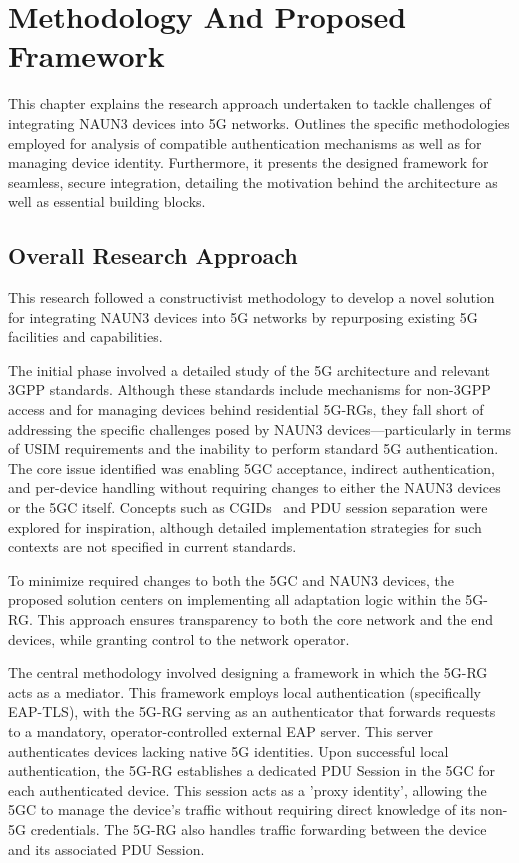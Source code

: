 \chapter{Methodology And Proposed Framework}%
\label{chapter:methodology-and-proposed-framework}

\begin{introduction}
This chapter explains the research approach undertaken to tackle challenges of integrating \ac{NAUN3} devices into \ac{5G} networks. Outlines the specific methodologies employed for analysis of compatible authentication mechanisms as well as for managing device identity. Furthermore, it presents the designed framework for seamless, secure integration, detailing the motivation behind the architecture as well as essential building blocks.
\end{introduction}

\section{Overall Research Approach}

This research followed a constructivist methodology to develop a novel solution for integrating \ac{NAUN3} devices into \ac{5G} networks by repurposing existing \ac{5G} facilities and capabilities.

The initial phase involved a detailed study of the \ac{5G} architecture and relevant \ac{3GPP} standards. Although these standards include mechanisms for non-\ac{3GPP} access and for managing devices behind residential \acp{5G-RG}, they fall short of addressing the specific challenges posed by \ac{NAUN3} devices—particularly in terms of \ac{USIM} requirements and the inability to perform standard \ac{5G} authentication. The core issue identified was enabling \ac{5GC} acceptance, indirect authentication, and per-device handling without requiring changes to either the \ac{NAUN3} devices or the \ac{5GC} itself. Concepts such as \acp{CGID}~\cite{23.316-p27} and \ac{PDU} session separation were explored for inspiration, although detailed implementation strategies for such contexts are not specified in current standards.

To minimize required changes to both the \ac{5GC} and \ac{NAUN3} devices, the proposed solution centers on implementing all adaptation logic within the \ac{5G-RG}. This approach ensures transparency to both the core network and the end devices, while granting control to the network operator.

The central methodology involved designing a framework in which the \ac{5G-RG} acts as a mediator. This framework employs local authentication (specifically \ac{EAP-TLS}), with the \ac{5G-RG} serving as an authenticator that forwards requests to a mandatory, operator-controlled external \ac{EAP} server. This server authenticates devices lacking native \ac{5G} identities. Upon successful local authentication, the \ac{5G-RG} establishes a dedicated \ac{PDU} Session in the \ac{5GC} for each authenticated device. This session acts as a 'proxy identity', allowing the \ac{5GC} to manage the device's traffic without requiring direct knowledge of its non-\ac{5G} credentials. The \ac{5G-RG} also handles traffic forwarding between the device and its associated \ac{PDU} Session.

